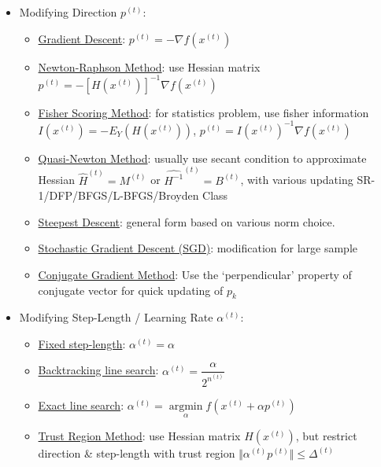 \begin{itemize}[topsep=2pt,itemsep=0pt]
    \item Modifying Direction $ p^{(t)} $:
    \begin{itemize}[topsep=2pt,itemsep=0pt]
        \item \hyperlink{GradientDescent}{Gradient Descent}: $ p^{(t)}=-\nabla f\left(x^{(t)}\right) $
        \item \hyperlink{NRMethod}{Newton-Raphson Method}: use Hessian matrix $ p^{(t)}=-\left[H(x^{(t)})\right]^{-1}\nabla f\left(x^{(t)}\right) $
        \item \hyperlink{FSNRMethod}{Fisher Scoring Method}: for statistics problem, use fisher information $ I\left(x^{(t)}\right)=-E_Y\left(H(x^{(t)})\right) $, $ p^{(t)}=I\left(x^{(t)}\right)^{-1}\nabla f\left(x^{(t)}\right)  $
        \item \hyperlink{QuasiNewtonMethod}{Quasi-Newton Method}: usually use secant condition to approximate Hessian $ \hat{H}^{(t)}=M^{(t)} $ or $ \hat{H^{-1}}^{(t)}=B^{(t)} $, with various updating SR-1/DFP/BFGS/L-BFGS/Broyden Class
        \item \hyperlink{SteepestDescent}{Steepest Descent}: general form based on various norm choice.
        \item \hyperlink{SGDMethod}{Stochastic Gradient Descent (SGD)}: modification for large sample
        \item \hyperlink{ConjugateGradientMethod}{Conjugate Gradient Method}: Use the `perpendicular' property of conjugate vector for quick updating of $ p_k $
    \end{itemize}
    \item Modifying Step-Length / Learning Rate $ \alpha ^{(t)} $:
    \begin{itemize}[topsep=2pt,itemsep=0pt]
        \item \hyperlink{FixedStepLength}{Fixed step-length}: $ \alpha ^{(t)}=\alpha  $
        \item \hyperlink{Backtracking}{Backtracking line search}: $ \alpha ^{(t)}=\dfrac{\alpha }{2^{n^{(t)}}} $ 
        \item \hyperlink{ExactLineSearch}{Exact line search}: $ \alpha ^{(t)}=\mathop{\arg\min}\limits_{\alpha }f\left(x^{(t)}+\alpha p^{(t)}\right)  $
        \item \hyperlink{TrustRegion}{Trust Region Method}: use Hessian matrix $ H(x^{(t)}) $, but restrict direction \& step-length with trust region $ \Vert \alpha ^{(t)}p^{(t)} \Vert\leq \Delta^{(t)}  $
    \end{itemize}

\end{itemize}

